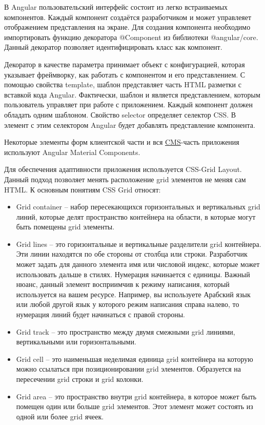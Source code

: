 В Angular пользовательский интерфейс состоит из легко встраиваемых компонентов.
Каждый компонент создаётся разработчиком и может управлеяет отображением представления на экране.
Для создания компонента необходимо импортировать функцию декоратора @Component из библиотеки @angular/core.
Данный декоратор позволяет идентифицировать класс как компонент.

Декоратор в качестве параметра принимает объект с конфигурацией, которая указывает фреймворку, как работать с компонентом и его представлением.
С помощью свойства template, шаблон представляет часть HTML разметки с вставкой кода Angular.
Фактически, шаблон и является представлением, которым пользователь управляет при работе с приложением.
Каждый компонент должен обладать одним шаблоном.
Свойство selector определяет селектор CSS. В элемент с этим селектором Angular будет добавлять представление компонента.

Некоторые элементы форм клиентской части и вся \hyperlink{gloss:cms}{CMS}-часть приложения используют Angular Material Components.

Для обеспечения адаптивности приложения используется CSS-Grid Layout.
Данный подход позволяет менять расположение grid элементов не меняя сам HTML. К основным понятиям CSS Grid относят:
\begin{itemize}
    \item Grid container – набор пересекающихся горизонтальных и вертикальных grid линий, которые делят пространство контейнера на области, в которые могут быть помещены grid элементы.
    \item Grid lines – это горизонтальные и вертикальные разделители grid контейнера.
    Эти линии находятся по обе стороны от столбца или строки.
    Разработчик может задать для данного элемента имя или числовой индекс, которые может использовать дальше в стилях.
    Нумерация начинается с единицы.
    Важный нюанс, данный элемент восприимчив к режиму написания, который используется на вашем ресурсе.
    Например, вы используете Арабский язык или любой другой язык у которого режим написания справа налево, то нумерация линий будет начинаться с правой стороны.
    \item Grid track – это пространство между двумя смежными grid линиями, вертикальными или горизонтальными.
    \item Grid cell – это наименьшая неделимая единица grid контейнера на которую можно ссылаться при позиционировании grid элементов.
    Образуется на пересечении grid строки и grid колонки.
    \item Grid area – это пространство внутри grid контейнера, в которое может быть помещен один или больше grid элементов.
    Этот элемент может состоять из одной или более grid ячеек.
\end{itemize}

